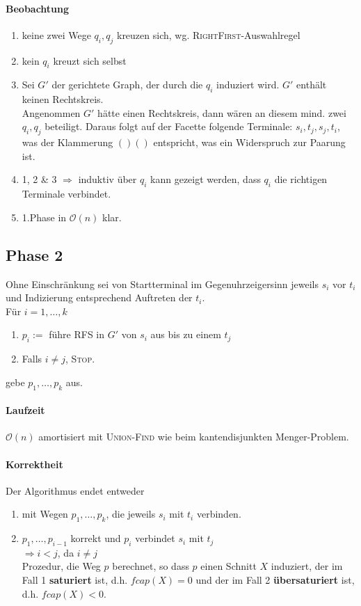 \documentclass{article}
\newcommand{\df}[1]{\textbf{#1}\index{#1}}
\renewcommand{\O}[1]{\mathcal{O}\left(#1\right)}
\begin{document}
\paragraph{Beobachtung} 
\begin{enumerate}
	\item keine zwei Wege $q_i, q_j$ kreuzen sich, wg. \textsc{RightFirst}-Auswahlregel
	\item kein $q_i$ kreuzt sich selbst
	\item Sei $G'$ der gerichtete Graph, der durch die $q_i$ induziert wird. $G'$ enthält keinen Rechtskreis.\\
	Angenommen $G'$ hätte einen Rechtskreis, dann wären an diesem mind. zwei $q_i, q_j$ beteiligt. Daraus folgt auf der Facette folgende Terminale: $s_i, t_j, s_j, t_i$, was der Klammerung $()()$ entspricht, was ein Widerspruch zur Paarung ist.\\
	\item 1, 2 \& 3 $\Longrightarrow$ induktiv über $q_i$ kann gezeigt werden, dass $q_i$ die richtigen Terminale verbindet.
	\item 1.Phase in $\O{n}$ klar.
\end{enumerate}


\subsection{Phase 2}
Ohne Einschränkung sei von Startterminal im Gegenuhrzeigersinn jeweils $s_i$ vor $t_i$ und Indizierung entsprechend Auftreten der $t_i$.\\
Für $i = 1, \ldots, k$
\begin{enumerate}
	\item $p_i := $ führe \textsc{RFS} in $G'$ von $s_i$ aus bis zu einem $t_j$
	\item Falls $i \neq j$, \textsc{Stop}.
\end{enumerate}
gebe $p_1,\ldots, p_k$ aus.

\paragraph{Laufzeit}
$\O{n}$ amortisiert mit \textsc{Union-Find} wie beim kantendisjunkten Menger-Problem.

\paragraph{Korrektheit}
Der Algorithmus endet entweder
\begin{enumerate}
	\item mit Wegen $p_1,\ldots, p_k$, die jeweils $s_i$ mit $t_i$ verbinden.
	\item $p_1,\ldots, p_{i-1}$ korrekt und $p_i$ verbindet $s_i$ mit $t_j$\\
	$\Longrightarrow i < j$, da $i \neq j$\\
	Prozedur, die Weg $p$ berechnet, so dass $p$ einen Schnitt $X$ induziert, der im Fall 1 \df{saturiert} ist, d.h. $fcap(X) = 0$ und der im Fall 2 \df{übersaturiert} ist, d.h. $fcap(X) < 0$.
\end{enumerate}
\end{document}
